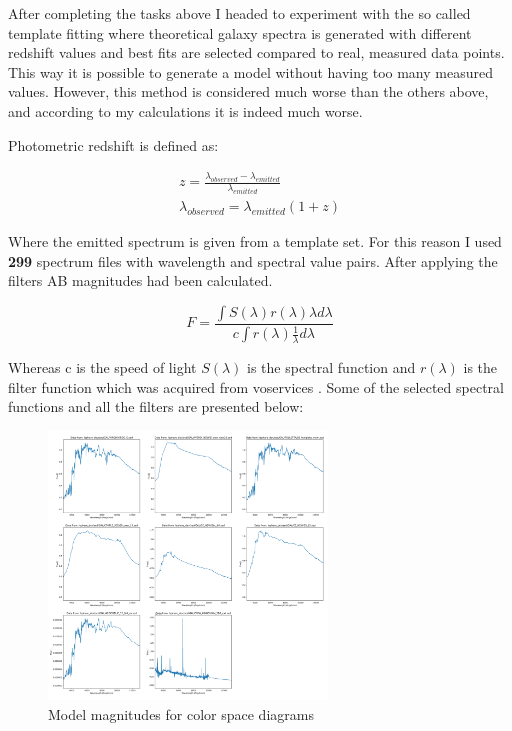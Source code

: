 \documentclass[a4paper,12pt]{article}
\begin{document}
\par After completing the tasks above I headed to experiment with the so called
template fitting where theoretical galaxy spectra is generated with different
redshift values and best fits are selected compared to real, measured data points.
This way it is possible to generate a model without having too many measured values.
However, this method is considered much worse than the others above, and according to
my calculations it is indeed much worse.

\par Photometric redshift is defined as:

\begin{align}
	z = \frac{\lambda_{observed} - \lambda_{emitted}}{\lambda_{emitted}} \\
	\lambda_{observed} = \lambda_{emitted}(1+z)
\end{align}

\par Where the emitted spectrum is given from a template set. For this reason
I used \textbf{299} spectrum files with wavelength and spectral value pairs. After applying
the filters AB magnitudes had been calculated.

\begin{equation}
	F = \frac{\int S(\lambda)r(\lambda)\lambda d\lambda}{c\int r(\lambda)\frac{1}{\lambda}d\lambda}
\end{equation}

\par Whereas c is the speed of light $S(\lambda)$ is the spectral function and $r(\lambda)$
is the filter function which was acquired from voservices \cite{voservices}. Some of
the selected spectral functions and all the filters are presented below:

\begin{figure}[H]
	\centering
	\includegraphics[width=0.66\textwidth]{./example-spectra.png}
	\caption{ Model magnitudes for color space diagrams }
\end{figure}
\end{document}
